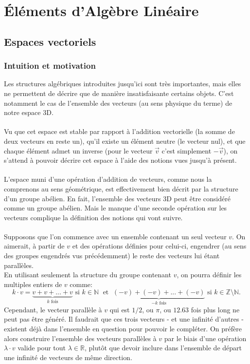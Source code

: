 \documentclass[oneside,12pt,french,table]{book}
\newcommand{\N}{\mathbb{N}}
\newcommand{\Z}{\mathbb{Z}}
\theoremstyle{definition}
\theoremstyle{definition}
\theoremstyle{definition}
\begin{document}
\chapter{Éléments d'Algèbre Linéaire} 
\section{Espaces vectoriels}
\subsection{Intuition et motivation}
    Les structures algébriques introduites jusqu'ici sont très importantes, mais elles ne permettent de décrire que de manière insatisfaisante certains objets. C'est notamment le cas de l'ensemble des vecteurs (au sens physique du terme) de notre espace 3D.
    \\ \\
    Vu que cet espace est stable par rapport à l'addition vectorielle (la somme de deux vecteurs en reste un), qu'il existe un élément neutre (le vecteur nul), et que chaque élément admet un inverse (pour le vecteur $\vec v$ c'est simplement $-\vec{v}$), on s'attend à pouvoir décrire cet espace à l'aide des notions vues jusqu'à présent. 
    \\ \\
    L'espace muni d'une opération d'addition de vecteurs, comme nous la comprenons au sens géométrique, est effectivement bien décrit par la structure d'un groupe abélien. En fait, l'ensemble des vecteurs 3D peut être considéré comme un groupe abélien. Mais le manque d'une seconde opération sur les vecteurs complique la définition des notions qui vont suivre. \\ \\
    Supposons que l'on commence avec un ensemble contenant un seul vecteur $v$. On aimerait, à partir de $v$ et des opérations définies pour celui-ci, engendrer (au sens des groupes engendrés vus précédemment) le reste des vecteurs lui étant parallèles. \\
    En utilisant seulement la structure du groupe contenant $v$, on pourra définir les multiples entiers de $v$ comme:
    $$ k \cdot v = \underbrace{v + v + ... + v}_{k \text{ fois}} \text{ si } k \in \N \; \text{ et } \;  \underbrace{(-v) + (-v) + ... + (-v)}_{-k \text{ fois}} \text{ si } k \in \Z \setminus \N.$$
    Cependant, le vecteur parallèle à $v$ qui est $1/2$, ou $\pi$, ou $12.63$ fois plus long ne peut pas être généré. Il faudrait que ces trois vecteurs - et une infinité d'autres - existent déjà dans l'ensemble en question pour pouvoir le compléter. On préfère alors construire l'ensemble des vecteurs parallèles à $v$ par le biais d'une opération $\lambda\cdot v$ valide pour tout $\lambda\in\mathbb R$, plutôt que devoir inclure dans l'ensemble de départ une infinité de vecteurs de même direction.
\end{document}
